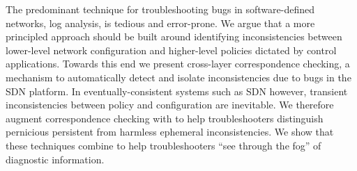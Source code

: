 The predominant technique for troubleshooting bugs in software-defined networks,
log analysis, is tedious and error-prone. We argue that a more principled
approach should be built around identifying inconsistencies between lower-level
network configuration and higher-level policies dictated by control
applications. Towards this end we present
cross-layer correspondence checking, a mechanism to automatically detect and
isolate inconsistencies due to bugs in the SDN platform. In
eventually-consistent systems such as SDN however,
transient inconsistencies between policy and configuration are inevitable.
We therefore augment correspondence checking with \simulator{} to help troubleshooters
distinguish pernicious persistent from harmless ephemeral inconsistencies. We
show that these techniques combine to help troubleshooters ``see through the fog'' of
diagnostic information.
